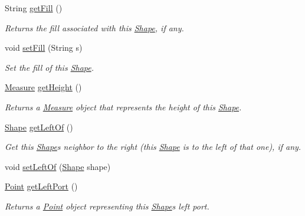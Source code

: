 \begin{DoxyCompactItemize}
String \hyperlink{classcom_1_1aarrelaakso_1_1drawl_1_1_shape_a0d9a33a3e151aaceeec140bea343a650}{get\+Fill} ()
\begin{DoxyCompactList}\small\item\em Returns the fill associated with this \hyperlink{classcom_1_1aarrelaakso_1_1drawl_1_1_shape}{Shape}, if any. \end{DoxyCompactList}\item 
void \hyperlink{classcom_1_1aarrelaakso_1_1drawl_1_1_shape_a2a2868c85bfbf4d2940d929950001b3d}{set\+Fill} (String s)
\begin{DoxyCompactList}\small\item\em Set the fill of this \hyperlink{classcom_1_1aarrelaakso_1_1drawl_1_1_shape}{Shape}. \end{DoxyCompactList}\item 
\hyperlink{classcom_1_1aarrelaakso_1_1drawl_1_1_measure}{Measure} \hyperlink{classcom_1_1aarrelaakso_1_1drawl_1_1_shape_ac9f74d31c332aab76b329edc22080e67}{get\+Height} ()
\begin{DoxyCompactList}\small\item\em Returns a \hyperlink{classcom_1_1aarrelaakso_1_1drawl_1_1_measure}{Measure} object that represents the height of this \hyperlink{classcom_1_1aarrelaakso_1_1drawl_1_1_shape}{Shape}. \end{DoxyCompactList}\item 
\hyperlink{classcom_1_1aarrelaakso_1_1drawl_1_1_shape}{Shape} \hyperlink{classcom_1_1aarrelaakso_1_1drawl_1_1_shape_a2b19d5964ac46d545a7bae3133df6532}{get\+Left\+Of} ()
\begin{DoxyCompactList}\small\item\em Get this \hyperlink{classcom_1_1aarrelaakso_1_1drawl_1_1_shape}{Shape}\textquotesingle{}s neighbor to the right (this \hyperlink{classcom_1_1aarrelaakso_1_1drawl_1_1_shape}{Shape} is to the left of that one), if any. \end{DoxyCompactList}\item 
void \hyperlink{classcom_1_1aarrelaakso_1_1drawl_1_1_shape_aad14fa860ab74cfa90815f56cf4c3ecf}{set\+Left\+Of} (\hyperlink{classcom_1_1aarrelaakso_1_1drawl_1_1_shape}{Shape} shape)
\item 
\hyperlink{classcom_1_1aarrelaakso_1_1drawl_1_1_point}{Point} \hyperlink{classcom_1_1aarrelaakso_1_1drawl_1_1_shape_aeffa96786ca552adf46924ec77da9555}{get\+Left\+Port} ()
\begin{DoxyCompactList}\small\item\em Returns a \hyperlink{classcom_1_1aarrelaakso_1_1drawl_1_1_point}{Point} object representing this \hyperlink{classcom_1_1aarrelaakso_1_1drawl_1_1_shape}{Shape}\textquotesingle{}s left port. \end{DoxyCompactList}\item 

\end{DoxyCompactItemize}
